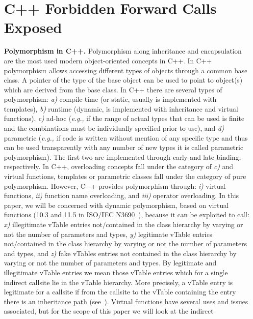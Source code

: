 \section{C++ Forbidden Forward Calls Exposed}
\label{C++ Bad Forward Indirect Calls}
\textbf{Polymorphism in C++.}
\label{Polymorphism in C++}
Polymorphism along inheritance and encapsulation
are the most used modern object-oriented concepts in C++. 
In C++ polymorphism allows accessing different types of objects 
through a common base class. A pointer of the type of the base object
can be used to point to object(s) which are derived from the base class.
In C++ there are several types of polymorphism:
\textit{a)} compile-time (or static, usually is implemented with templates), 
\textit{b)} runtime (dynamic, is implemented with inheritance and virtual functions), 
\textit{c)} ad-hoc (\textit{e.g.,} if the range of actual types that can be used is finite and the combinations must be individually specified prior to use), and
\textit{d)} parametric (\textit{e.g.,} if code is written without mention of any specific type and thus can be used transparently with any number of new types it is called parametric polymorphism). 
The first two are implemented through early 
and late binding, respectively.
In C++, overloading concepts fall under the category of \textit{c)} and virtual functions, templates or parametric classes fall under the category of pure polymorphism.
However, C++ provides polymorphism through: 
\textit{i)} virtual functions,
\textit{ii)} function name overloading, and 
\textit{iii)} operator overloading. 
In this paper, we will be concerned with dynamic polymorphism, based on virtual functions (10.3 and 11.5 in ISO/IEC N3690~\cite{iso:iecN3690}), because it can be exploited to call: 
\textit{x)} illegitimate vTable entries not/contained in the class hierarchy by varying or not the number of parameters and types,
\textit{y)} legitimate vTable entries not/contained in the class hierarchy by varying or not the number of parameters and types, and 
\textit{z)} fake vTables entries not contained in the class hierarchy by varying or not the number of parameters and types.
By legitimate and illegitimate vTable entries we mean those 
vTable entries which for a single indirect callsite lie in the 
vTable hierarchy. More precisely, a vTable entry is legitimate for 
a callsite if from the callsite to the vTable containing the entry there
is an inheritance path (see~\cite{haller:shrinkwrap}).
Virtual functions have several uses and issues associated, 
but for the scope of this paper we will look at the indirect 
